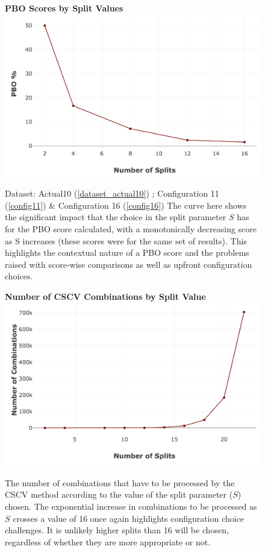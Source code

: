 \documentclass[a4paper,11pt,oneside]{article}
\theoremstyle{plain}
\theoremstyle{definition}
\begin{document}
	\begin{figure}[H]
		\centering 
		\textbf{PBO Scores by Split Values}
		\includegraphics[scale=0.4]{images/results/8_9_pbo/PBO_by_Split.png} 
		\caption[PBO Scores by Split Values]{Dataset: Actual10 (\ref{dataset_actual10}) ; Configuration 11 (\ref{config11}) \&  Configuration 16 (\ref{config16})
			\newline The curve here shows the significant impact that the choice in the split parameter $S$ has for the PBO score calculated, with a monotonically decreasing score as S increases (these scores were for the same set of results). This highlights the contextual nature of a PBO score and the problems raised with score-wise comparisons as well as upfront configuration choices. }
		\label{figure-PBO_by_Split}
	\end{figure}
	
	\begin{figure}[H]
		\centering 
		\textbf{Number of CSCV Combinations by Split Value}
		\includegraphics[scale=0.4]{images/results/8_9_pbo/combination_sizes.png} 
		\caption[Number of CSCV Combinations by Split Value]{
			\newline The number of combinations that have to be processed by the CSCV method according to the value of the split parameter ($S$) chosen. The exponential increase in combinations to be processed as $S$ crosses a value of 16 once again highlights configuration choice challenges. It is unlikely higher splits than 16 will be chosen, regardless of whether they are more appropriate or not.}
		\label{figure-s_combinations}
	\end{figure}
	
\end{document}
